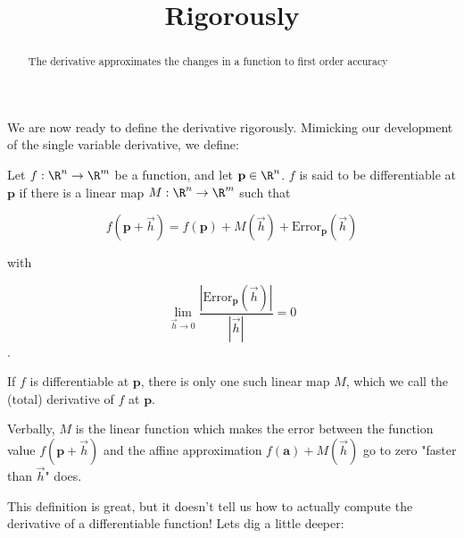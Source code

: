 \documentclass{ximera}
\title{Rigorously}
\begin{document}
	\begin{abstract}
		The derivative approximates the changes in a function to first order accuracy
	\end{abstract}
	
	We are now ready to define the derivative rigorously.  Mimicking our development of the single variable derivative, we define:

\begin{definition}
	Let $f :\R^n \to \R^m$ be a function, and let $\mathbf{p} \in \R^n$.  
	 $f$ is said to be differentiable at $\mathbf{p}$ if there is a linear map $M:\R^n \to \R^m$ such that 
		
		\[ f(\mathbf{p}+\vec{h}) = f(\mathbf{p}) + M(\vec{h})+ \text{Error}_{\mathbf{p}}(\vec{h})\]
		
		with
		
		\[ \displaystyle\lim_{\vec{h} \to 0} \frac{\left|\text{Error}_{\mathbf{p}}(\vec{h})\right|}{\left|\vec{h}\right|} = 0 \].
		
		If $f$ is differentiable at $\mathbf{p}$, there is only one such linear map $M$, which we call the (total) derivative of $f$ at $\mathbf{p}$.  
		
		Verbally,  $M$ is the linear function which makes the error between the function value $f(\mathbf{p}+\vec{h})$ and the affine approximation 
		$f(\mathbf{a})+M(\vec{h})$ go to zero "faster than $\vec{h}$" does.
\end{definition}

This definition is great, but it doesn't tell us how to actually compute the derivative of a differentiable function!  Lets dig a little deeper:
\end{document}
